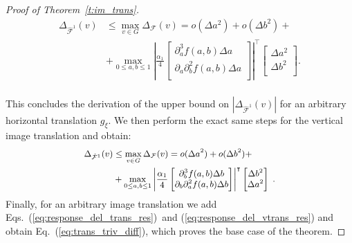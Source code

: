 \documentclass[10pt,journal,compsoc]{IEEEtran}
\newcommand{\hmF}{\hat{\mathcal{F}}}
\begin{document}
\begin{proof}[Proof of Theorem~\ref{t:im_trans}]
\begin{equation}
\begin{aligned}
		\Delta_{\hmF^1} (v) & \leq \max_{v \in G} \Delta_\mathcal{F} (v)  = o(\Delta a^2) + o(\Delta b^2) + \\
		& +
		\max_{0 \leq a,b \leq 1}
		\left| \frac{\alpha_1}{4}
		\begin{bmatrix}
		\partial^3_a f(a,b)\Delta a\\
		\partial_a\partial^2_b f(a,b) \Delta a\\
		\end{bmatrix}
		\right|^\intercal
		\begin{bmatrix}
		\Delta a^2 \\
		\Delta b^2 \\
		\end{bmatrix}. \\
		\end{aligned}
		\label{eq:response_del_trans_res}
		\end{equation}

		This concludes the derivation of the upper bound on $\left|\Delta_{\hmF^1} (v)\right|$ for an arbitrary horizontal translation $g_\xi$. We then perform the exact same steps for the vertical image translation and obtain:
		\begin{equation}
		\small
		\begin{aligned}
		\Delta_{\hmF^1} (v) & \leq \max_{v \in G} \Delta_\mathcal{F} (v)  = o(\Delta a^2) + o(\Delta b^2) + \\
		& +
		\max_{0 \leq a,b \leq 1}
		\left| \frac{\alpha_1}{4}
		\begin{bmatrix}
		\partial^3_b f(a,b)\Delta b\\
		\partial_b\partial^2_a f(a,b) \Delta b\\
		\end{bmatrix}
		\right|^\intercal
		\begin{bmatrix}
		\Delta b^2 \\
		\Delta a^2 \\
		\end{bmatrix}\;.\\
		\end{aligned}
		\label{eq:response_del_vtrans_res}
		\end{equation}
		\noindent
		Finally, for an arbitrary image translation we add  Eqs.~(\ref{eq:response_del_trans_res})~and (\ref{eq:response_del_vtrans_res}) and obtain Eq.~(\ref{eq:trans_triv_diff}), which proves the base case of the theorem.


\end{proof}
\end{document}
